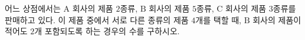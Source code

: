 \hspace*{2mm}\begin{minipage}[t]{\dimexpr\linewidth-2mm\relax}\vspace{0pt}
어느 상점에서는 $\mathrm{A}$ 회사의 제품 $2$종류, $\mathrm{B}$ 회사의 제품 $5$종류, $\mathrm{C}$ 회사의 제품 $3$종류를 판매하고 있다. 이 제품 중에서 서로 다른 종류의 제품 $4$개를 택할 때, $\mathrm{B}$ 회사의 제품이 적어도 $2$개 포함되도록 하는 경우의 수를 구하시오.\end{minipage}
